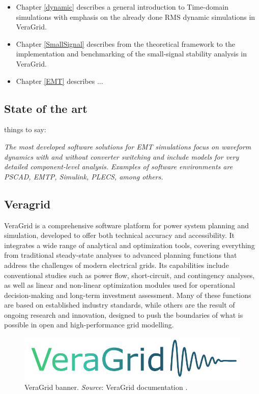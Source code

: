 \begin{itemize}
  \item Chapter \ref{dynamic} describes a general introduction to Time-domain simulations with emphasis on the already done RMS dynamic simulations 
  in VeraGrid.
  \item Chapter \ref{SmallSignal} describes from the theoretical framework to the implementation and benchmarking of the small-signal 
stability analysis in VeraGrid.
  \item Chapter \ref{EMT} describes ...
\end{itemize}

\subsection{State of the art}

things to say:

\textit{The most developed software solutions for EMT simulations
 focus on waveform dynamics with and without converter switching
  and include models for very detailed component-level analysis.
   Examples of software environments are PSCAD, EMTP,
 Simulink, PLECS, among others.}


\subsection{Veragrid}

VeraGrid is a comprehensive software platform for power system planning and simulation, developed to offer both technical accuracy and accessibility. 
It integrates a wide range of analytical and optimization tools, covering everything from traditional steady-state analyses to advanced planning functions 
that address the challenges of modern electrical grids. Its capabilities include conventional studies such as power flow, short-circuit, and contingency analyses, 
as well as linear and non-linear optimization modules used for operational decision-making and long-term investment assessment. Many of these functions are based on 
established industry standards, while others are the result of ongoing research and innovation, designed to push the boundaries of what is possible in open and high-performance 
grid modelling.

\begin{figure}[H]
  \centering
  \includegraphics[width=0.8\linewidth]{figures/VeraGrid_banner.png}
  \caption{VeraGrid banner. \textit{Source}: VeraGrid documentation \cite{veragrid}.}
  \label{fig:VeraGrid_banner}
\end{figure}

